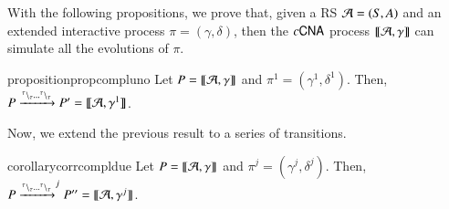 With the following propositions, we prove that, given a RS ${\cal A} = (S, A)$ and an extended  interactive process $\pi=(\gamma,\delta)$, then the $c\textsf{CNA}$ process $\llbracket{\cal A},\gamma\rrbracket$ can simulate all the evolutions  of $\pi$. 

 \begin{restatable}[Completeness 1]{proposition}{propcompluno} 
 \label{prop:compl1}
Let   $P=\llbracket{\cal A},\gamma\rrbracket$ and $\pi^1 = (\gamma^1,\delta^1)$.
Then, 
  $P \xrightarrow{{}^{\tau} \backslash_{\tau}\dots {}^{\tau} \backslash_{\tau}} P'=\llbracket{\cal A},\gamma^1\rrbracket$.
\end{restatable}


Now, we extend the previous result to a series of transitions.
 
\begin{restatable}[Completeness 2]{corollary}{corrcompldue} 
 \label{corr:compl2}
Let $P=\llbracket{\cal A},\gamma\rrbracket$ and  $\pi^j= (\gamma^j,\delta^j)$.  
Then, $P \xrightarrow{{}^{\tau} \backslash_{\tau}\dots{}^{\tau} \backslash_{\tau}}^j P''=\llbracket{\cal A},\gamma^j\rrbracket$.  
 \end{restatable}




 
% 
 
 
 
 
  